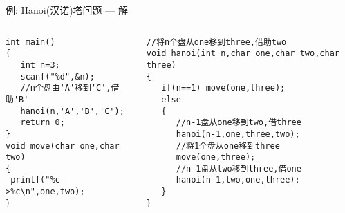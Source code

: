 \begin{frame}{例: Hanoi(汉诺)塔问题 --- 解}
\vspace{-0.4cm}
\begin{columns}[T]
\begin{lstlisting}
int main()
{
   int n=3;
   scanf("%d",&n);
   //n个盘由'A'移到'C',借助'B'
   hanoi(n,'A','B','C');
   return 0;
}
void move(char one,char two)
{
 printf("%c->%c\n",one,two);
}
\end{lstlisting}
\begin{lstlisting}[frame=leftline]
//将n个盘从one移到three,借助two
void hanoi(int n,char one,char two,char three)
{
   if(n==1) move(one,three); 
   else
   {
      //n-1盘从one移到two,借three
      hanoi(n-1,one,three,two); 
      //将1个盘从one移到three
      move(one,three); 
      //n-1盘从two移到three,借one
      hanoi(n-1,two,one,three); 
   }
}
\end{lstlisting}
\end{columns}
~\\
\end{frame}

